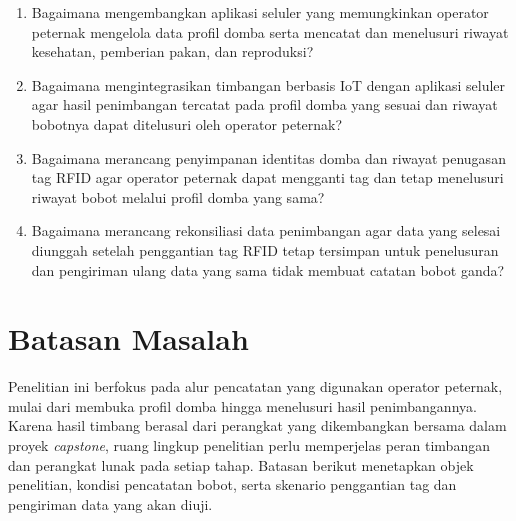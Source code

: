 \begin{enumerate}
  \setlength{\emergencystretch}{1.5em}
  \item Bagaimana mengembangkan aplikasi seluler yang memungkinkan {\setlength{\fboxsep}{1pt}\colorbox{revisilama}{operator}} {\setlength{\fboxsep}{1pt}\colorbox{revisibaru}{peternak}}
        mengelola data profil domba serta mencatat dan menelusuri riwayat
        kesehatan, pemberian pakan, dan reproduksi?
  \item Bagaimana mengintegrasikan timbangan berbasis IoT dengan aplikasi
        seluler agar hasil penimbangan tercatat pada profil domba yang sesuai
        dan riwayat bobotnya dapat ditelusuri oleh {\setlength{\fboxsep}{1pt}\colorbox{revisilama}{operator}} {\setlength{\fboxsep}{1pt}\colorbox{revisibaru}{peternak}}?
  \item Bagaimana merancang penyimpanan identitas domba dan riwayat penugasan
        tag RFID agar {\setlength{\fboxsep}{1pt}\colorbox{revisilama}{operator}} {\setlength{\fboxsep}{1pt}\colorbox{revisibaru}{peternak}} dapat mengganti tag dan tetap menelusuri
        riwayat bobot melalui profil domba yang sama?
  \item Bagaimana merancang rekonsiliasi data penimbangan agar data yang
        selesai diunggah setelah penggantian tag RFID tetap tersimpan untuk
        penelusuran dan pengiriman ulang data yang sama tidak membuat catatan
        bobot ganda?
\end{enumerate}

\section{Batasan Masalah}%

\begin{sesudahrevisi}
Penelitian ini berfokus pada alur pencatatan yang digunakan {\setlength{\fboxsep}{1pt}\colorbox{revisilama}{operator}} {\setlength{\fboxsep}{1pt}\colorbox{revisibaru}{peternak}}, mulai
dari membuka profil domba hingga menelusuri hasil penimbangannya. Karena
hasil timbang berasal dari perangkat yang dikembangkan bersama dalam proyek
\textit{capstone}, ruang lingkup penelitian perlu memperjelas peran timbangan
dan perangkat lunak pada setiap tahap. Batasan berikut menetapkan objek
penelitian, kondisi pencatatan bobot, serta skenario penggantian tag dan
pengiriman data yang akan diuji.
\end{sesudahrevisi}

